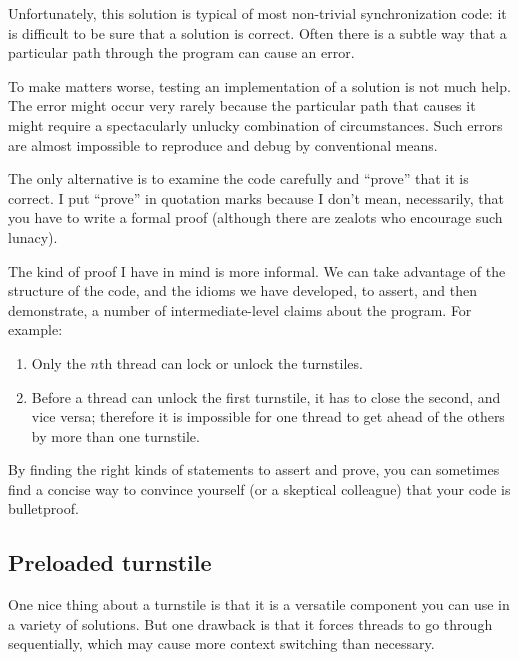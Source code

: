 \documentclass{book}
\newcommand{\clearemptydoublepage}{\newpage\cleardoublepage}
\begin{document}
Unfortunately, this solution is typical of most non-trivial
synchronization code: it is difficult to be sure that a solution is
correct.  Often there is a subtle way that a particular path through
the program can cause an error.

To make matters worse, testing an implementation of a solution
is not much help.  The error might occur very rarely
because the particular path that causes it might
require a spectacularly unlucky combination of circumstances.
Such errors are almost
impossible to reproduce and debug by conventional means.

The only alternative is to examine the code carefully and
``prove'' that it is correct.  I put ``prove'' in quotation
marks because I don't mean, necessarily, that you have to write
a formal proof (although there are zealots who encourage
such lunacy).

The kind of proof I have in mind is more informal.  We can take
advantage of the structure of the code, and the idioms we have
developed, to assert, and then demonstrate, a number of
intermediate-level claims about the program.  For example:

\begin{enumerate}

\item Only the $n$th thread can lock or unlock the turnstiles.

\item Before a thread can unlock the first turnstile, it has to close 
the second, and vice versa; therefore it is impossible for one thread
to get ahead of the others by more than one turnstile.

\end{enumerate}

By finding the right kinds of statements to assert and
prove, you can sometimes find a concise way to convince yourself
(or a skeptical colleague) that your code is bulletproof.



\clearemptydoublepage
\subsection {Preloaded turnstile}

One nice thing about a turnstile is that it is a versatile
component you can use in a variety of solutions.  But one
drawback is that it forces threads to go through sequentially,
which may cause more context switching than necessary.
\end{document}
